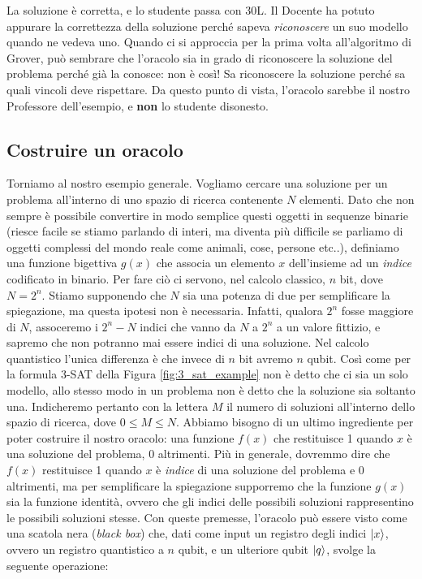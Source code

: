 \documentclass{book}
\theoremstyle{definition}
\theoremstyle{definition}
\theoremstyle{definition}
\theoremstyle{plain}
\theoremstyle{plain}
\theoremstyle{plain}
\theoremstyle{plain}
\begin{document}
La soluzione è corretta, e lo studente passa con 30L. Il Docente ha potuto appurare la correttezza della soluzione perché sapeva \emph{riconoscere} un suo modello quando ne vedeva uno. Quando ci si approccia per la prima volta all'algoritmo di Grover, può sembrare che l'oracolo sia in grado di riconoscere la soluzione del problema perché già la conosce: non è così! Sa riconoscere la soluzione perché sa quali vincoli deve rispettare. Da questo punto di vista, l'oracolo sarebbe il nostro Professore dell'esempio, e \textbf{non} lo studente disonesto.

\subsection{Costruire un oracolo}

Torniamo al nostro esempio generale. Vogliamo cercare una soluzione per un problema all'interno di uno spazio di ricerca contenente $N$ elementi. Dato che non sempre è possibile convertire in modo semplice questi oggetti in sequenze binarie (riesce facile se stiamo parlando di interi, ma diventa più difficile se parliamo di oggetti complessi del mondo reale come animali, cose, persone etc..), definiamo una funzione bigettiva $g(x)$ che associa un elemento $x$ dell'insieme ad un \emph{indice} codificato in binario. Per fare ciò ci servono, nel calcolo classico, $n$ bit, dove $N = 2^n$. Stiamo supponendo che $N$ sia una potenza di due per semplificare la spiegazione, ma questa ipotesi non è necessaria. Infatti, qualora $2^n$ fosse maggiore di $N$, assoceremo i $2^n - N$ indici che vanno da $N$ a $2^n$ a un valore fittizio, e sapremo che non potranno mai essere indici di una soluzione. Nel calcolo quantistico l'unica differenza è che invece di $n$ bit avremo $n$ qubit. Così come per la formula 3-SAT della Figura \ref{fig:3_sat_example} non è detto che ci sia un solo modello, allo stesso modo in un problema non è detto che la soluzione sia soltanto una. Indicheremo pertanto con la lettera $M$ il numero di soluzioni all'interno dello spazio di ricerca, dove $0 \leq M \leq N$. Abbiamo bisogno di un ultimo ingrediente per poter costruire il nostro oracolo: una funzione $f(x)$ che restituisce 1 quando $x$ è una soluzione del problema, 0 altrimenti. Più in generale, dovremmo dire che $f(x)$ restituisce 1 quando $x$ è \emph{indice} di una soluzione del problema e 0 altrimenti, ma per semplificare la spiegazione supporremo che la funzione $g(x)$ sia la funzione identità, ovvero che gli indici delle possibili soluzioni rappresentino le possibili soluzioni stesse.
Con queste premesse, l'oracolo può essere visto come una scatola nera (\emph{black box}) che, dati come input un registro degli indici $\ket{x}$, ovvero un registro quantistico a $n$ qubit, e un ulteriore qubit $\ket{q}$, svolge la seguente operazione:
\end{document}
